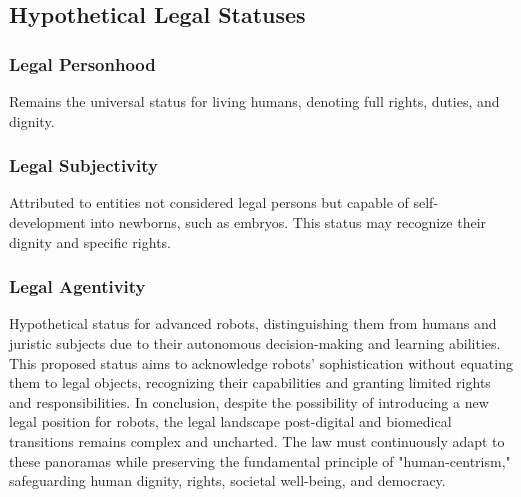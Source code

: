 \subsection{Hypothetical Legal Statuses}
\subsubsection{Legal Personhood}
Remains the universal status for living humans, denoting full rights, duties, and dignity.
\subsubsection{Legal Subjectivity}
Attributed to entities not considered legal persons but capable of self-development into newborns, such as embryos. This status may recognize their dignity and specific rights.
\subsubsection{Legal Agentivity}
Hypothetical status for advanced robots, distinguishing them from humans and juristic subjects due to their autonomous decision-making and learning abilities.
\newline
This proposed status aims to acknowledge robots' sophistication without equating them to legal objects, recognizing their capabilities and granting limited rights and responsibilities.
\newline
\newline
In conclusion, despite the possibility of introducing a new legal position for robots, the legal landscape post-digital and biomedical transitions remains complex and uncharted. The law must continuously adapt to these panoramas while preserving the fundamental principle of "human-centrism," safeguarding human dignity, rights, societal well-being, and democracy.
